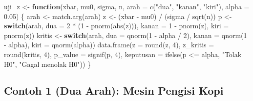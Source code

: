 \documentclass[
  indonesian,
  letterpaper,
]{book}
\newenvironment{Shaded}{\begin{snugshade}}{\end{snugshade}}
\newcommand{\AttributeTok}[1]{\textcolor[rgb]{0.40,0.45,0.13}{#1}}
\newcommand{\ControlFlowTok}[1]{\textcolor[rgb]{0.00,0.23,0.31}{\textbf{#1}}}
\newcommand{\DecValTok}[1]{\textcolor[rgb]{0.68,0.00,0.00}{#1}}
\newcommand{\FloatTok}[1]{\textcolor[rgb]{0.68,0.00,0.00}{#1}}
\newcommand{\FunctionTok}[1]{\textcolor[rgb]{0.28,0.35,0.67}{#1}}
\newcommand{\NormalTok}[1]{\textcolor[rgb]{0.00,0.23,0.31}{#1}}
\newcommand{\OtherTok}[1]{\textcolor[rgb]{0.00,0.23,0.31}{#1}}
\newcommand{\SpecialCharTok}[1]{\textcolor[rgb]{0.37,0.37,0.37}{#1}}
\newcommand{\StringTok}[1]{\textcolor[rgb]{0.13,0.47,0.30}{#1}}
\begin{document}
\begin{Shaded}
\begin{Highlighting}[]
\NormalTok{uji\_z    }\OtherTok{\textless{}{-}} \ControlFlowTok{function}\NormalTok{(xbar, mu0, sigma, n, }\AttributeTok{arah =} \FunctionTok{c}\NormalTok{(}\StringTok{"dua"}\NormalTok{, }\StringTok{"kanan"}\NormalTok{, }\StringTok{"kiri"}\NormalTok{), }\AttributeTok{alpha =} \FloatTok{0.05}\NormalTok{) \{}
\NormalTok{  arah   }\OtherTok{\textless{}{-}} \FunctionTok{match.arg}\NormalTok{(arah)}
\NormalTok{  z      }\OtherTok{\textless{}{-}}\NormalTok{ (xbar }\SpecialCharTok{{-}}\NormalTok{ mu0) }\SpecialCharTok{/}\NormalTok{ (sigma }\SpecialCharTok{/} \FunctionTok{sqrt}\NormalTok{(n))}
\NormalTok{  p      }\OtherTok{\textless{}{-}} \ControlFlowTok{switch}\NormalTok{(arah,}
                   \AttributeTok{dua   =} \DecValTok{2} \SpecialCharTok{*}\NormalTok{ (}\DecValTok{1} \SpecialCharTok{{-}} \FunctionTok{pnorm}\NormalTok{(}\FunctionTok{abs}\NormalTok{(z))),}
                   \AttributeTok{kanan =} \DecValTok{1} \SpecialCharTok{{-}} \FunctionTok{pnorm}\NormalTok{(z),}
                   \AttributeTok{kiri  =} \FunctionTok{pnorm}\NormalTok{(z))}
\NormalTok{  kritis }\OtherTok{\textless{}{-}} \ControlFlowTok{switch}\NormalTok{(arah,}
                   \AttributeTok{dua   =} \FunctionTok{qnorm}\NormalTok{(}\DecValTok{1} \SpecialCharTok{{-}}\NormalTok{ alpha }\SpecialCharTok{/} \DecValTok{2}\NormalTok{),}
                   \AttributeTok{kanan =} \FunctionTok{qnorm}\NormalTok{(}\DecValTok{1} \SpecialCharTok{{-}}\NormalTok{ alpha),}
                   \AttributeTok{kiri  =} \FunctionTok{qnorm}\NormalTok{(alpha))}
  \FunctionTok{data.frame}\NormalTok{(}\AttributeTok{z =} \FunctionTok{round}\NormalTok{(z, }\DecValTok{4}\NormalTok{), }\AttributeTok{z\_kritis =} \FunctionTok{round}\NormalTok{(kritis, }\DecValTok{4}\NormalTok{), }\AttributeTok{p\_value =} \FunctionTok{signif}\NormalTok{(p, }\DecValTok{4}\NormalTok{),}
             \AttributeTok{keputusan   =} \FunctionTok{ifelse}\NormalTok{(p }\SpecialCharTok{\textless{}=}\NormalTok{ alpha, }\StringTok{"Tolak H0"}\NormalTok{, }\StringTok{"Gagal menolak H0"}\NormalTok{))}
\NormalTok{\}}
\end{Highlighting}
\end{Shaded}

\subsection{Contoh 1 (Dua Arah): Mesin Pengisi
Kopi}\label{contoh-1-dua-arah-mesin-pengisi-kopi}
\end{document}
